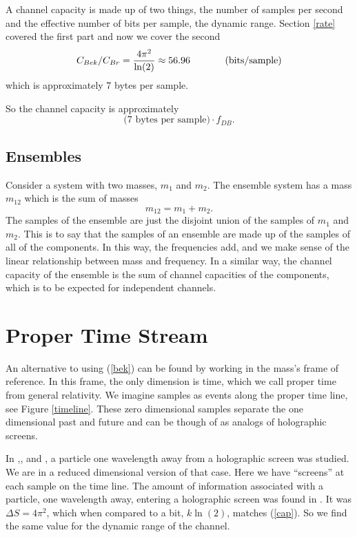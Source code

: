 \documentclass[12pt,a4paper]{article}
\begin{document}
A channel capacity is made up of two things, the number of samples per second and the effective number of bits per sample, the dynamic range.  Section \ref{rate} covered the first part and now we cover the second
\begin{equation}
\label{cap}
   C_{Bek} / C_{Br} = \frac{4 \pi^2}{\ln(2)} \approx 56.96 \hspace{0.5 in} (\si[per-mode=symbol]{bits\per sample})
\end{equation}
which is approximately 7 bytes per sample. 

So the channel capacity is approximately
\[
\text{(7 bytes per sample)} \cdot f_{DB}.
\]

\subsection{Ensembles}
Consider a system with two masses, $m_1$ and $m_2$.  The ensemble system has a mass $m_{12}$ which is the sum of masses
\[
m_{12} = m_1 + m_2.
\]
The samples of the ensemble are just the disjoint union of the samples of $m_1$ and $m_2$.   This is to say that the samples of an ensemble are made up of the samples of all of the components.  In this way, the frequencies add, and we make sense of the linear relationship between mass and frequency.  In a similar way, the channel capacity of the ensemble is the sum of channel capacities of the components, which is to be expected for independent channels.

\section{Proper Time Stream}
An alternative to using (\ref{bek}) can be found by working in the mass's frame of reference. In this frame, the only dimension is time, which we call proper time from general relativity.  We imagine samples as events along the proper time line, see Figure \ref{timeline}.  These zero dimensional samples separate the one dimensional past and future and can be though of as analogs of holographic screens.  

In \cite{thrust},\cite{entropic}, and \cite{bekenstein}, a particle one wavelength away from a holographic screen was studied.  We are in a reduced dimensional version of that case.  Here we have ``screens'' at each sample on the time line.  The amount of information associated with a particle, one wavelength away, entering a holographic screen was found in \cite{thrust}.  It was $\Delta S = 4\pi^2$, which when compared to a bit, $k \ln(2)$, matches (\ref{cap}).  So we find the same value for the dynamic range of the channel.
\end{document}
